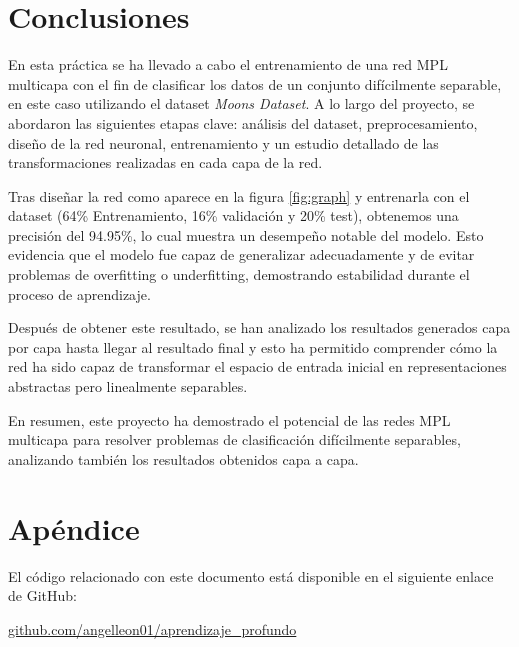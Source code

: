 \documentclass[paper=a4, fontsize=11pt]{scrartcl} %
\numberwithin{equation}{section} %
\numberwithin{figure}{section} %
\numberwithin{table}{section} %
\begin{document}
\section{Conclusiones}
En esta práctica se ha llevado a cabo el entrenamiento de una red MPL multicapa con el fin de clasificar los datos de un conjunto difícilmente separable, en este caso utilizando el dataset \textit{Moons Dataset}. A lo largo del proyecto, se abordaron las siguientes etapas clave: análisis del dataset, preprocesamiento, diseño de la red neuronal, entrenamiento y un estudio detallado de las transformaciones realizadas en cada capa de la red.

Tras diseñar la red como aparece en la figura \ref{fig:graph} y entrenarla con el dataset (64\% Entrenamiento, 16\% validación y 20\% test), obtenemos una precisión del 94.95\%, lo cual muestra un desempeño notable del modelo. Esto evidencia que el modelo fue capaz de generalizar adecuadamente y de evitar problemas de overfitting o underfitting, demostrando estabilidad durante el proceso de aprendizaje.

Después de obtener este resultado, se han analizado los resultados generados capa por capa hasta llegar al resultado final y esto ha permitido comprender cómo la red ha sido capaz de transformar el espacio de entrada inicial en representaciones abstractas pero linealmente separables.

En resumen, este proyecto ha demostrado el potencial de las redes MPL multicapa para resolver problemas de clasificación difícilmente separables, analizando también los resultados obtenidos capa a capa.



\newpage
\appendix
\section*{Apéndice}
El código relacionado con este documento está disponible en el siguiente enlace de GitHub:
\begin{center}
    \href{https://github.com/angelleon01/aprendizaje_profundo}{github.com/angelleon01/aprendizaje\_profundo}
\end{center}
\end{document}
